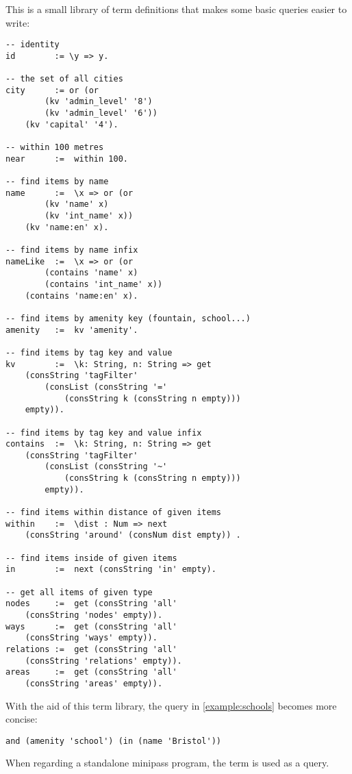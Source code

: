\documentclass[main.tex]{subfiles}
\begin{document}
This is a small library of term definitions that makes some basic queries
easier to write:
\begin{lstlisting}
-- identity
id        := \y => y.

-- the set of all cities
city      := or (or
        (kv 'admin_level' '8')
        (kv 'admin_level' '6'))
    (kv 'capital' '4').

-- within 100 metres
near      :=  within 100.

-- find items by name
name      :=  \x => or (or
        (kv 'name' x)
        (kv 'int_name' x))
    (kv 'name:en' x).

-- find items by name infix
nameLike  :=  \x => or (or
        (contains 'name' x)
        (contains 'int_name' x))
    (contains 'name:en' x).

-- find items by amenity key (fountain, school...)
amenity   :=  kv 'amenity'.

-- find items by tag key and value
kv        :=  \k: String, n: String => get
    (consString 'tagFilter'
        (consList (consString '='
            (consString k (consString n empty)))
    empty)).

-- find items by tag key and value infix
contains  :=  \k: String, n: String => get
    (consString 'tagFilter'
        (consList (consString '~'
            (consString k (consString n empty)))
        empty)).

-- find items within distance of given items
within    :=  \dist : Num => next
    (consString 'around' (consNum dist empty)) .

-- find items inside of given items
in        :=  next (consString 'in' empty).

-- get all items of given type
nodes     :=  get (consString 'all'
    (consString 'nodes' empty)).
ways      :=  get (consString 'all'
    (consString 'ways' empty)).
relations :=  get (consString 'all'
    (consString 'relations' empty)).
areas     :=  get (consString 'all'
    (consString 'areas' empty)).
\end{lstlisting}

\begin{example}
    With the aid of this term library, the query in \cref{example:schools}
    becomes more concise:

    \begin{lstlisting}
and (amenity 'school') (in (name 'Bristol'))
    \end{lstlisting}
\end{example}

When regarding a standalone minipass program, the term  is used
as a query.
\end{document}
